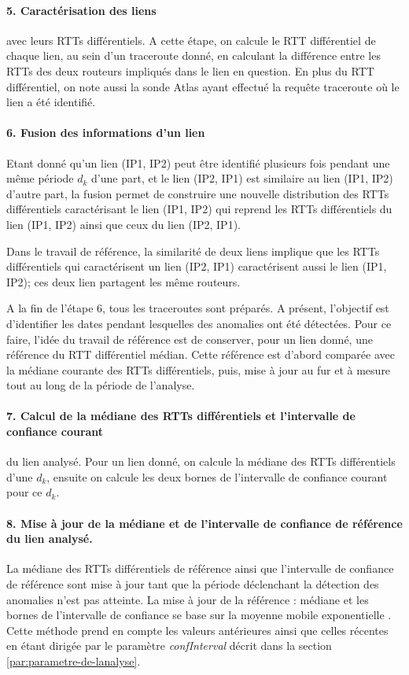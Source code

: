 \paragraph{5. Caractérisation des liens} avec leurs RTTs différentiels. A cette étape, on calcule le RTT différentiel de chaque  lien, au sein d'un traceroute donné, en calculant la différence entre les RTTs des deux routeurs impliqués dans le  lien en question. En plus du RTT différentiel, on note aussi la sonde Atlas ayant effectué la requête traceroute où le lien a été identifié. 

\paragraph{6. Fusion des informations d'un lien} Etant donné qu'un lien (IP1, IP2) peut être identifié plusieurs fois pendant une même période $d_k$ d'une part, et le lien (IP2, IP1) est similaire au lien  (IP1, IP2) d'autre part, la fusion permet de construire une nouvelle distribution des RTTs différentiels caractérisant le lien (IP1, IP2) qui reprend les RTTs différentiels du lien (IP1, IP2) ainsi que ceux du lien (IP2, IP1).

Dans le travail de référence, la similarité de deux liens  implique que les RTTs différentiels qui caractérisent un lien (IP2, IP1) caractérisent aussi le lien (IP1, IP2); ces deux lien partagent les même routeurs.


A la fin de l'étape 6, tous les traceroutes sont préparés. A présent, l'objectif est d'identifier les dates pendant lesquelles des anomalies ont été détectées. Pour ce faire, l'idée du travail de référence est de conserver, pour un lien donné, une référence du RTT différentiel médian.  Cette référence est d'abord comparée avec la médiane courante des RTTs différentiels,  puis,  mise à jour au fur et à mesure   tout au long de la période de l'analyse.

  
  \paragraph{7. Calcul de la médiane des RTTs différentiels et   l'intervalle de confiance courant} du lien analysé. Pour un lien donné, on calcule la médiane des RTTs différentiels d'une $d_k$, ensuite on calcule les deux bornes de l'intervalle de confiance courant pour ce $d_k$.  
  
 
  
  \paragraph{8. Mise à jour de la médiane et de l'intervalle  de confiance de  référence du lien analysé.} La médiane des RTTs différentiels de référence ainsi que l'intervalle de confiance de référence sont mise à jour tant que la période déclenchant la détection des anomalies n'est pas atteinte.  La mise à jour de la référence : médiane et les bornes de l'intervalle de confiance se base sur la moyenne mobile exponentielle . Cette méthode prend en compte les valeurs antérieures ainsi que celles récentes en étant dirigée par le paramètre \textit{confInterval} décrit dans la section \ref{par:parametre-de-lanalyse}.
  

